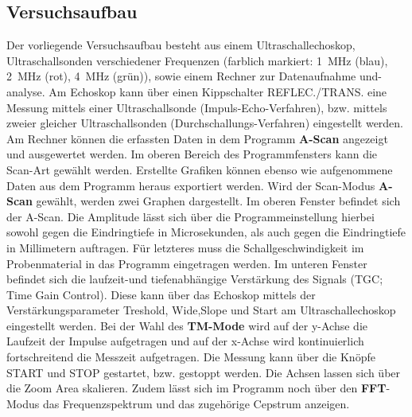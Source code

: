 \subsection{Versuchsaufbau}
\label{sec:Versuchsaufbau}
Der vorliegende Versuchsaufbau besteht aus einem Ultraschallechoskop, Ultraschallsonden verschiedener Frequenzen (farblich markiert: \SI{1}{\mega\Hz} (blau),  \SI{2}{\mega\Hz} (rot),  \SI{4}{\mega\Hz} (grün)), sowie einem Rechner zur Datenaufnahme und-analyse.
Am Echoskop kann über einen Kippschalter REFLEC./TRANS. eine Messung mittels einer Ultraschallsonde (Impuls-Echo-Verfahren), bzw. mittels zweier gleicher Ultraschallsonden (Durchschallungs-Verfahren) eingestellt werden.
Am Rechner können die erfassten Daten in dem Programm \textbf{A-Scan} angezeigt und ausgewertet werden.
Im oberen Bereich des Programmfensters kann die Scan-Art gewählt werden.
Erstellte Grafiken können ebenso wie aufgenommene Daten aus dem Programm heraus exportiert werden.
Wird der Scan-Modus \textbf{A-Scan} gewählt, werden zwei Graphen dargestellt. Im oberen Fenster befindet sich der A-Scan. Die Amplitude lässt sich über die Programmeinstellung hierbei sowohl gegen die Eindringtiefe in Microsekunden, als auch gegen die Eindringtiefe in Millimetern auftragen. Für letzteres muss die Schallgeschwindigkeit im Probenmaterial in das Programm eingetragen werden.
Im unteren Fenster befindet sich die laufzeit-und tiefenabhängige Verstärkung des Signals (TGC; Time Gain Control). Diese kann über das Echoskop mittels der Verstärkungsparameter Treshold, Wide,Slope und Start am Ultraschallechoskop eingestellt werden.
Bei der Wahl des \textbf{TM-Mode} wird auf der y-Achse die Laufzeit der Impulse aufgetragen und auf der x-Achse wird kontinuierlich fortschreitend die Messzeit aufgetragen.
Die Messung kann über die Knöpfe START und STOP gestartet, bzw. gestoppt werden.
Die Achsen lassen sich über die Zoom Area skalieren.
Zudem lässt sich im Programm noch über den \textbf{FFT}-Modus das Frequenzspektrum und das zugehörige Cepstrum anzeigen.
